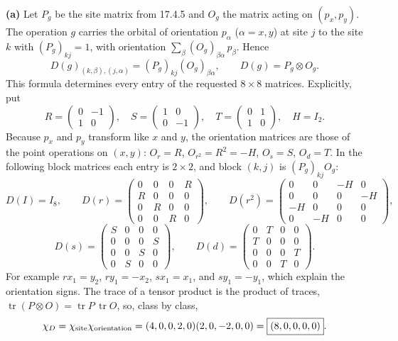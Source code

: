 \textbf{(a)} Let $P_g$ be the site matrix from 17.4.5 and $O_g$
the matrix acting on $(p_x,p_y)$. The operation $g$ carries the
orbital of orientation $p_\alpha$ ($\alpha=x,y$) at site $j$ to the
site $k$ with $(P_g)_{kj}=1$, with orientation
$\sum_\beta(O_g)_{\beta\alpha}\,p_\beta$. Hence
\[
D(g)_{(k,\beta),(j,\alpha)}=(P_g)_{kj}(O_g)_{\beta\alpha},\qquad
\boxed{D(g)=P_g\otimes O_g}.
\]
This formula determines every entry of the requested $8\times8$
matrices. Explicitly, put
\[
R=\begin{pmatrix}0&-1\\1&0\end{pmatrix},\quad
S=\begin{pmatrix}1&0\\0&-1\end{pmatrix},\quad
T=\begin{pmatrix}0&1\\1&0\end{pmatrix},\quad H=I_2.
\]
Because $p_x$ and $p_y$ transform like $x$ and $y$, the orientation
matrices are those of the point operations on $(x,y)$:
$O_r=R$, $O_{r^2}=R^2=-H$, $O_s=S$, $O_d=T$.
In the following block matrices each entry is $2\times2$, and
block $(k,j)$ is $(P_g)_{kj}O_g$:
\[
D(I)=I_8,\qquad
D(r)=\begin{pmatrix}0&0&0&R\\R&0&0&0\\0&R&0&0\\0&0&R&0\end{pmatrix},
\qquad
D(r^2)=\begin{pmatrix}0&0&-H&0\\0&0&0&-H\\-H&0&0&0\\0&-H&0&0\end{pmatrix},
\]
\[
D(s)=\begin{pmatrix}S&0&0&0\\0&0&0&S\\0&0&S&0\\0&S&0&0\end{pmatrix},
\qquad
D(d)=\begin{pmatrix}0&T&0&0\\T&0&0&0\\0&0&0&T\\0&0&T&0\end{pmatrix}.
\]
For example $rx_1=y_2$, $ry_1=-x_2$, $sx_1=x_1$, and
$sy_1=-y_1$, which explain the orientation signs.
The trace of a tensor product is the product of traces,
$\operatorname{tr}(P\otimes O)=\operatorname{tr}P\,\operatorname{tr}O$,
so, class by class,
\[
\chi_D=\chi_{\rm site}\chi_{\rm orientation}
=(4,0,0,2,0)(2,0,-2,0,0)
=\boxed{(8,0,0,0,0)}.
\]

